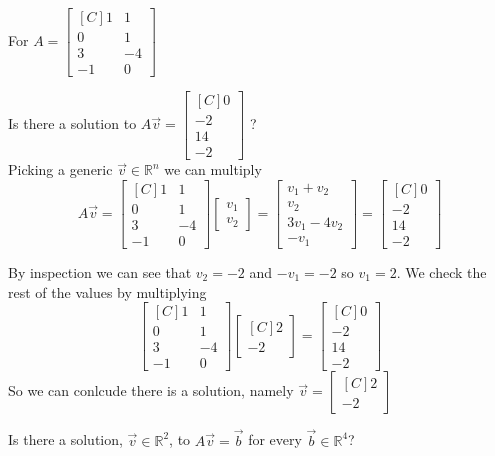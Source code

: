\begin{example}
For $A=\begin{bmatrix*}[C]
1  & 1 \\
0  & 1 \\
3  & -4\\
-1 & 0 
\end{bmatrix*}$\\
\begin{inparaenum}[a.)]
\item Is there a solution to 
$A\vec{v}=\begin{bmatrix*}[C] 0 \\ -2 \\ 14 \\ -2 \end{bmatrix*}$ ?\\

Picking a generic  $\vec{v}\in\mathbb{R}^n$ we can multiply
\[
A\vec{v}=
\begin{bmatrix*}[C]
1  & 1 \\
0  & 1 \\
3  & -4\\
-1 & 0 
\end{bmatrix*}\begin{bmatrix}v_1\\v_2\end{bmatrix}
=\begin{bmatrix*}
v_1+v_2\\
v_2\\
3v_1-4v_2\\
-v_1
\end{bmatrix*}
=\begin{bmatrix*}[C] 0 \\ -2 \\ 14 \\ -2 \end{bmatrix*}
\]

By inspection we can see that $v_2=-2$ and $-v_1=-2$ so $v_1=2$. We check the
rest of the values by multiplying
\[
\begin{bmatrix*}[C]
1  & 1 \\
0  & 1 \\
3  & -4\\
-1 & 0 
\end{bmatrix*}\begin{bmatrix*}[C]2\\-2\end{bmatrix*}
=\begin{bmatrix*}[C] 0 \\ -2 \\ 14 \\ -2 \end{bmatrix*}
\]
So we can conlcude there is a solution, namely 
$\vec{v}=\begin{bmatrix*}[C]2\\-2\end{bmatrix*}$\\
%
\item Is there a solution, $\vec{v} \in \mathbb{R}^2$, to $A\vec{v}=\vec{b}$ 
for every $\vec{b} \in \mathbb{R}^4$?


\end{inparaenum}
\end{example}
